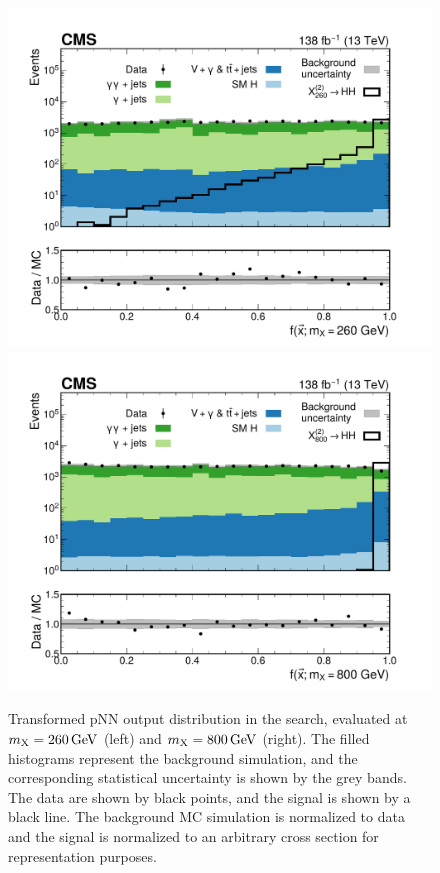 \begin{figure}
    \centering
    \includegraphics[width=.49\textwidth]{Figures/Dihiggs/categorisation/intermediate_transformed_score_GluGluToBulkGravitonToHHTo2G2Tau_M-260_GluGluToBulkGravitonToHHTo2G2Tau_M-260_paper.pdf}
    \includegraphics[width=.49\textwidth]{Figures/Dihiggs/categorisation/intermediate_transformed_score_GluGluToBulkGravitonToHHTo2G2Tau_M-800_GluGluToBulkGravitonToHHTo2G2Tau_M-800_paper.pdf}
    \caption[Transformed pNN Output Score Distribution in \XTwoHH Search]{Transformed pNN output distribution in the \XTwoHH search, evaluated at $m_{\mathrm{X}}=260\,\text{Ge\hspace{-.08em}V}$ (left) and $m_{\mathrm{X}}=800\,\text{Ge\hspace{-.08em}V}$ (right). The filled histograms represent the background simulation, and the corresponding statistical uncertainty is shown by the grey bands. The data are shown by black points, and the signal is shown by a black line. The background MC simulation is normalized to data and the signal is normalized to an arbitrary cross section for representation purposes.}\label{fig:pnn_xhh_evolution}
\end{figure}

